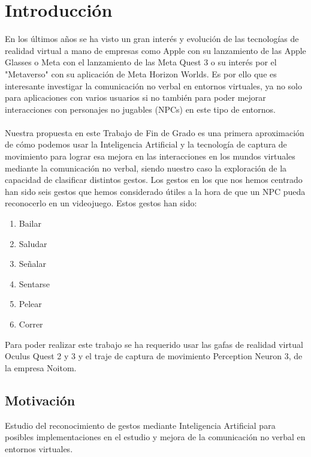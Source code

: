 \chapter{Introducción}
\label{cap:introduccion}


En los últimos años se ha visto un gran interés y evolución de las tecnologías de realidad virtual a mano de empresas como Apple con su lanzamiento de las Apple Glasses o Meta con el lanzamiento de las Meta Quest 3 o su interés por el "Metaverso" con su aplicación de Meta Horizon Worlds.
Es por ello que es interesante investigar la comunicación no verbal en entornos virtuales, ya no solo para aplicaciones con varios usuarios si no también para poder mejorar interacciones con personajes no jugables (NPCs) en este tipo de entornos. \\ \\
Nuestra propuesta en este Trabajo de Fin de Grado es una primera aproximación de cómo podemos usar la Inteligencia Artificial y la tecnología de captura de movimiento para lograr esa mejora en las interacciones en los mundos virtuales mediante la comunicación no verbal, siendo nuestro caso la exploración de la capacidad de clasificar distintos gestos.
Los gestos en los que nos hemos centrado han sido seis gestos que hemos considerado útiles a la hora de que un NPC pueda reconocerlo en un videojuego. Estos gestos han sido:
\begin{enumerate}
	\item Bailar
	\item Saludar
	\item Señalar
	\item Sentarse
	\item Pelear
	\item Correr
\end{enumerate}

Para poder realizar este trabajo se ha requerido usar las gafas de realidad virtual Oculus Quest 2 y 3 y el traje de captura de movimiento Perception Neuron 3, de la empresa Noitom.
\section{Motivación}
Estudio del reconocimiento de gestos mediante Inteligencia Artificial para posibles implementaciones en el estudio y mejora de la comunicación no verbal en entornos virtuales.

